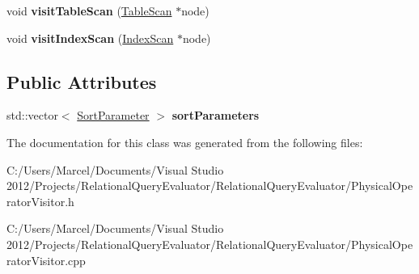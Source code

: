 \begin{DoxyCompactItemize}
\item 
\hypertarget{class_sort_resolving_physical_operator_visitor_a39e47ce8a74242f9f2d4b5b98f7a4bb9}{void {\bfseries visit\+Table\+Scan} (\hyperlink{class_table_scan}{Table\+Scan} $\ast$node)}\label{class_sort_resolving_physical_operator_visitor_a39e47ce8a74242f9f2d4b5b98f7a4bb9}

\item 
\hypertarget{class_sort_resolving_physical_operator_visitor_a2ea2205b6cdf14abf427d65e486116d8}{void {\bfseries visit\+Index\+Scan} (\hyperlink{class_index_scan}{Index\+Scan} $\ast$node)}\label{class_sort_resolving_physical_operator_visitor_a2ea2205b6cdf14abf427d65e486116d8}

\end{DoxyCompactItemize}
\subsection*{Public Attributes}
\begin{DoxyCompactItemize}
\item 
\hypertarget{class_sort_resolving_physical_operator_visitor_aa962193d5211541430e94f2a0961c641}{std\+::vector$<$ \hyperlink{class_sort_parameter}{Sort\+Parameter} $>$ {\bfseries sort\+Parameters}}\label{class_sort_resolving_physical_operator_visitor_aa962193d5211541430e94f2a0961c641}

\end{DoxyCompactItemize}


The documentation for this class was generated from the following files\+:\begin{DoxyCompactItemize}
\item 
C\+:/\+Users/\+Marcel/\+Documents/\+Visual Studio 2012/\+Projects/\+Relational\+Query\+Evaluator/\+Relational\+Query\+Evaluator/Physical\+Operator\+Visitor.\+h\item 
C\+:/\+Users/\+Marcel/\+Documents/\+Visual Studio 2012/\+Projects/\+Relational\+Query\+Evaluator/\+Relational\+Query\+Evaluator/Physical\+Operator\+Visitor.\+cpp\end{DoxyCompactItemize}
